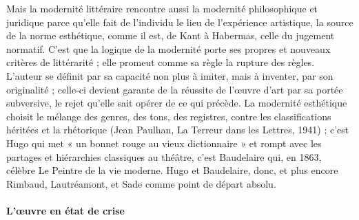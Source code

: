 Mais la modernité littéraire rencontre aussi la modernité philosophique et juridique parce qu'elle fait de l'individu le lieu de l'expérience artistique, la source de la norme esthétique, comme il est, de Kant à Habermas, celle du jugement normatif. C'est que la logique de la modernité porte ses propres et nouveaux critères de littérarité ; elle promeut comme sa règle la rupture des règles. L'auteur se définit par sa capacité non plus à imiter, mais à inventer, par son originalité ; celle-ci devient garante de la réussite de l'œuvre d'art par sa portée subversive, le rejet qu'elle sait opérer de ce qui précède. La modernité esthétique choisit le mélange des genres, des tons, des registres, contre les classifications héritées et la rhétorique (Jean Paulhan, La Terreur dans les Lettres, 1941) ; c'est Hugo qui met « un bonnet rouge au vieux dictionnaire » et rompt avec les partages et hiérarchies classiques au théâtre, c'est Baudelaire qui, en 1863, célèbre Le Peintre de la vie moderne. Hugo et Baudelaire, donc, et plus encore Rimbaud, Lautréamont, et Sade comme point de départ absolu.
 
 \paragraph{L'œuvre en état de crise}

